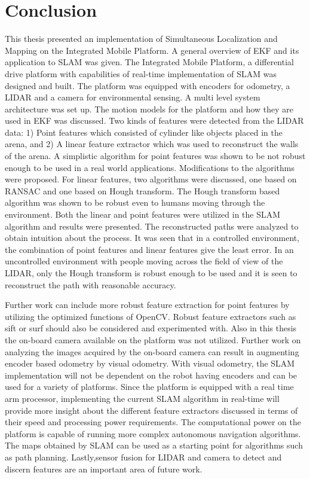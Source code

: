 \chapter{Conclusion}

This thesis presented an implementation of Simultaneous Localization and Mapping on the Integrated Mobile Platform. A general overview of EKF and its application to SLAM was given. The Integrated Mobile Platform, a differential drive platform with capabilities of real-time implementation of SLAM was designed and built. The platform was equipped with encoders for odometry, a LIDAR and a camera for environmental sensing. A multi level system architecture was set up. The motion models for the platform and how they are used in EKF was discussed. Two kinds of features were detected from the LIDAR data: 1) Point features which consisted of cylinder like objects placed in the arena, and 2) A linear feature extractor which was used to reconstruct the walls of the arena. A simplistic algorithm for point features was shown to be not robust enough to be used in a real world applications. Modifications to the algorithms were proposed. For linear features, two algorithms were discussed, one based on RANSAC and one based on Hough transform. The Hough transform based algorithm was shown to be robust even to humans moving through the environment. Both the linear and point features were utilized in the SLAM algorithm and results were presented. The reconstructed paths were analyzed to obtain intuition about the process. It was seen that in a controlled environment, the combination of point features and linear features give the least error. In an uncontrolled environment with people moving across the field of view of the LIDAR, only the Hough transform is robust enough to be used and it is seen to reconstruct the path with reasonable accuracy. 


Further work can include more robust feature extraction for point features by utilizing the optimized functions of OpenCV. Robust feature extractors such as sift or surf should also be considered and experimented with. Also in this thesis the on-board camera available on the platform was not utilized. Further work on analyzing the images acquired by the on-board camera can result in augmenting encoder based odometry by visual odometry. With visual odometry, the SLAM implementation will not be dependent on the robot having encoders and can be used for a variety of platforms. Since the platform is equipped with a real time arm processor, implementing the current SLAM algorithm in real-time will provide more insight about the different feature extractors discussed in terms of their speed and processing power requirements. The computational power on the platform is capable of running more complex autonomous navigation algorithms. The maps obtained by SLAM can be used as a starting point for algorithms such as path planning. Lastly,sensor fusion for LIDAR and camera to detect and discern features are an important area of future work.
